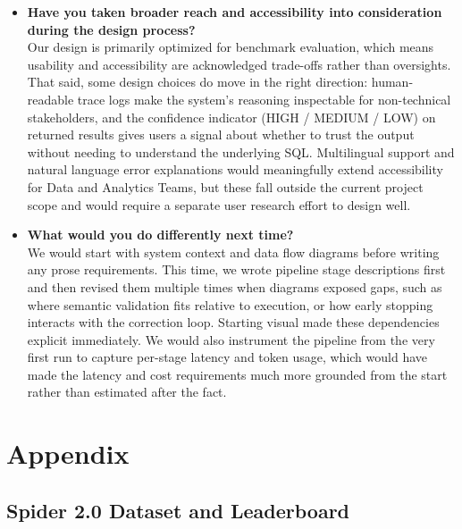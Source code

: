 \begin{itemize}
    \item \textbf{Have you taken broader reach and accessibility into consideration during the design process?} \\
    Our design is primarily optimized for benchmark evaluation, which means usability and accessibility are acknowledged trade-offs rather than oversights. That said, some design choices do move in the right direction: human-readable trace logs make the system's reasoning inspectable for non-technical stakeholders, and the confidence indicator (HIGH / MEDIUM / LOW) on returned results gives users a signal about whether to trust the output without needing to understand the underlying SQL. Multilingual support and natural language error explanations would meaningfully extend accessibility for Data and Analytics Teams, but these fall outside the current project scope and would require a separate user research effort to design well.

    \item \textbf{What would you do differently next time?} \\
    We would start with system context and data flow diagrams before writing any prose requirements. This time, we wrote pipeline stage descriptions first and then revised them multiple times when diagrams exposed gaps, such as where semantic validation fits relative to execution, or how early stopping interacts with the correction loop. Starting visual made these dependencies explicit immediately. We would also instrument the pipeline from the very first run to capture per-stage latency and token usage, which would have made the latency and cost requirements much more grounded from the start rather than estimated after the fact.
\end{itemize}

\section{Appendix}
\subsection{Spider 2.0 Dataset and Leaderboard}

